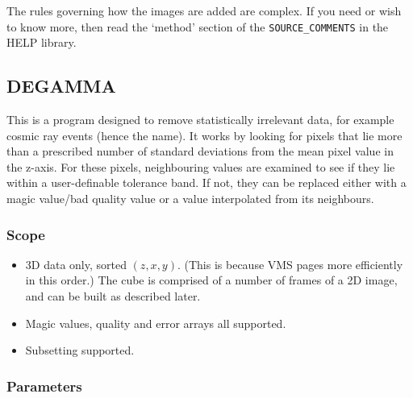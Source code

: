 The rules governing how the images are added are complex. If you need or wish
to know more, then read the `method' section of the {\tt SOURCE\_COMMENTS} in 
the HELP library.  

\subsection{DEGAMMA}

This is a program designed to remove statistically irrelevant data, for example 
cosmic ray events (hence the name). It works by looking for pixels that lie
more than a prescribed number of standard deviations from the mean pixel value
in the z-axis. For these pixels, neighbouring values are examined to see if
they lie within a user-definable tolerance band. If not, they can be replaced
either with a magic value/bad quality value or a value interpolated from its
neighbours.

\subsubsection{Scope}

\begin{itemize}
\item 3D data only, sorted $(z,x,y)$. (This is because VMS pages more
efficiently in this order.) The cube is comprised of a number of frames of a 2D
image, and can be built as described later.                                 
\item Magic values, quality and error arrays all supported.
\item Subsetting supported.
\end{itemize}

\subsubsection{Parameters}

